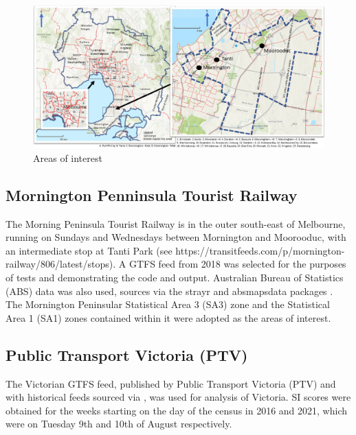 \documentclass[preprint, 3p,
authoryear]{elsarticle} %
\begin{document}
\begin{figure}
\includegraphics[width=1\linewidth]{graphics/all_maps} \caption{Areas of interest}\label{fig:Melbourne_map}
\end{figure}

\hypertarget{mornington-penninsula-tourist-railway}{%
\subsection{Mornington Penninsula Tourist
Railway}\label{mornington-penninsula-tourist-railway}}

The Morning Peninsula Tourist Railway is in the outer south-east of
Melbourne, running on Sundays and Wednesdays between Mornington and
Moorooduc, with an intermediate stop at Tanti Park (see
https://transitfeeds.com/p/mornington-railway/806/latest/stops). A GTFS
feed from 2018 was selected for the purposes of tests and demonstrating
the code and output. Australian Bureau of Statistics (ABS) data was also
used, sources via the strayr and absmapsdata packages \citep{r-strayr}.
The Mornington Peninsular Statistical Area 3 (SA3) zone and the
Statistical Area 1 (SA1) zones contained within it were adopted as the
areas of interest.

\hypertarget{public-transport-victoria-ptv}{%
\subsection{Public Transport Victoria
(PTV)}\label{public-transport-victoria-ptv}}

The Victorian GTFS feed, published by Public Transport Victoria (PTV)
and with historical feeds sourced via
\citet{transitfeeds_victoria:2023aa}, was used for analysis of Victoria.
SI scores were obtained for the weeks starting on the day of the census
in 2016 and 2021, which were on Tuesday 9th and 10th of August
respectively.
\end{document}
